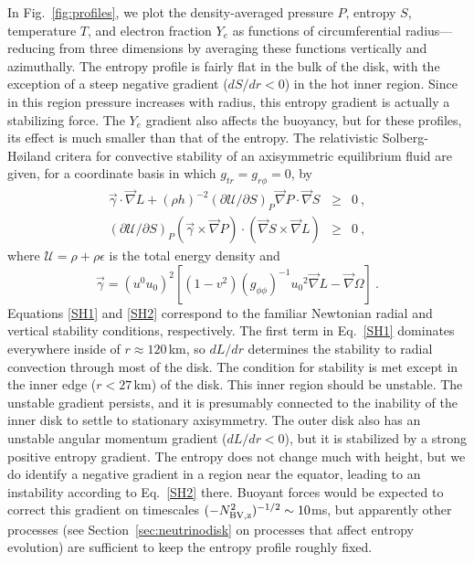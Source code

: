In Fig.~\ref{fig:profiles}, we plot the density-averaged pressure $P$,
entropy $S$, temperature $T$, and electron fraction $Y_e$ as functions
of circumferential radius---reducing from three dimensions by averaging
these functions vertically and azimuthally.
The entropy profile is fairly flat in
the bulk of the disk, with the exception of a steep negative gradient
($dS/dr<0$) 
in the hot inner region.  Since in this region pressure increases with
radius, this entropy gradient is actually a stabilizing force.  The $Y_e$
gradient also affects the
buoyancy,
but for these profiles,
its effect is much smaller than that of the entropy.  The relativistic
Solberg-H{\o}iland critera for convective stability of an axisymmetric
equilibrium fluid are given, for a coordinate basis in which
$g_{tr}=g_{r\phi}=0$, by \citep{1975ApJ...197..745S}
\begin{eqnarray}
\label{SH1}
\vec{\gamma}\cdot\vec{\nabla} L + (\rho h)^{-2}(\partial\mathcal{U}/\partial S)_P
\vec{\nabla} P\cdot\vec{\nabla} S &\ge& 0\ , \\
\label{SH2}
(\partial\mathcal{U}/\partial S)_P(\vec{\gamma}\times\vec{\nabla}P)\cdot
(\vec{\nabla}S\times\vec{\nabla}L) &\ge& 0\ ,
\end{eqnarray}
where $\mathcal{U}=\rho+\rho\epsilon$ is the total energy density and
\begin{equation}
\vec{\gamma} = (u^0u_0)^2[(1-v^2)(g_{\phi\phi})^{-1}u_0{}^2\vec{\nabla}L
-\vec{\nabla}\Omega]\ .
\end{equation}
Equations \ref{SH1} and \ref{SH2} correspond to the familiar Newtonian
radial and vertical stability conditions, respectively. 
The first term in Eq.~\ref{SH1} dominates everywhere inside
of $r\approx 120$\,km, so $dL/dr$ determines the stability to radial convection
through most of the disk. 
The condition for stability is met except in the inner edge ($r<27$\,km)
of the disk.  This inner region should be unstable.  The unstable
gradient persists, and it is presumably connected to the inability
of the inner disk to settle to stationary axisymmetry.  The outer
disk also has an unstable angular momentum gradient ($dL/dr<0$), but
it is stabilized by a strong positive entropy gradient. 
The entropy does not change much with height, but we do
identify a negative gradient in a region near the equator, leading to
an instability according to Eq.~\ref{SH2} there.  Buoyant forces would be
expected
to correct this gradient on timescales $(-N_{\rm BV,z}^2)^{-1/2}\sim 10$ms, but
apparently other processes (see Section~\ref{sec:neutrinodisk} on processes
that affect entropy
evolution) are sufficient to keep the entropy profile roughly fixed.

